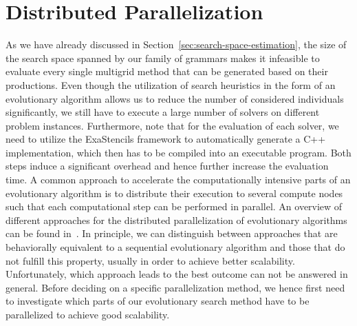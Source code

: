 \section{Distributed Parallelization}
\label{sec:distributed-parallelization}
As we have already discussed in Section~\ref{sec:search-space-estimation}, the size of the search space spanned by our family of grammars makes it infeasible to evaluate every single multigrid method that can be generated based on their productions.
Even though the utilization of search heuristics in the form of an evolutionary algorithm allows us to reduce the number of considered individuals significantly, we still have to execute a large number of solvers on different problem instances.
Furthermore, note that for the evaluation of each solver, we need to utilize the ExaStencils framework to automatically generate a C++ implementation, which then has to be compiled into an executable program.
Both steps induce a significant overhead and hence further increase the evaluation time.
A common approach to accelerate the computationally intensive parts of an evolutionary algorithm is to distribute their execution to several compute nodes such that each computational step can be performed in parallel.
An overview of different approaches for the distributed parallelization of evolutionary algorithms can be found in~\cite{gong2015distributed}.
In principle, we can distinguish between approaches that are behaviorally equivalent to a sequential evolutionary algorithm and those that do not fulfill this property, usually in order to achieve better scalability.
Unfortunately, which approach leads to the best outcome can not be answered in general.
Before deciding on a specific parallelization method, we hence first need to investigate which parts of our evolutionary search method have to be parallelized to achieve good scalability.

